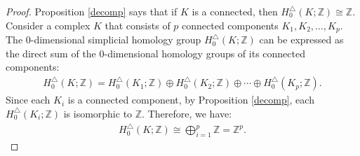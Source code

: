 \begin{proof}
	Proposition \ref{decomp} says that if \( K \) is a connected, then \( H^{\triangle}_{0}(K; \mathbb{Z}) \cong \mathbb{Z} \). Consider a complex \( K \) that consists of \( p \) connected components \( K_1, K_2, \ldots, K_p \). The $0$-dimensional simplicial homology group \( H^{\triangle}_{0}(K; \mathbb{Z}) \) can be expressed as the direct sum of the $0$-dimensional homology groups of its connected components:
	\begin{align}
		H^{\triangle}_{0}(K; \mathbb{Z}) = H^{\triangle}_{0}(K_1; \mathbb{Z}) \oplus H^{\triangle}_{0}(K_2; \mathbb{Z}) \oplus \cdots \oplus H^{\triangle}_{0}(K_p; \mathbb{Z}). 
	\end{align}	
	Since each \( K_i \) is a connected component, by Proposition \ref{decomp}, each \( H^{\triangle}_{0}(K_i; \mathbb{Z}) \) is isomorphic to \( \mathbb{Z} \). Therefore, we have:
	\begin{align}
		H^{\triangle}_{0}(K; \mathbb{Z}) \cong \bigoplus_{i=1}^p \mathbb{Z} = \mathbb{Z}^{p}. 
	\end{align}
\end{proof}


